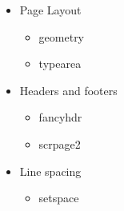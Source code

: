 \documentclass{article}
\begin{document}
	\begin{itemize}
		\item Page Layout
			\begin{itemize}
	\item geometry
	\item typearea
			\end{itemize}
	\item Headers and footers
			\begin{itemize}
	\item fancyhdr
	\item scrpage2
			\end{itemize}
	\item Line spacing
			\begin{itemize}
	\item setspace
			\end{itemize}
	\end{itemize}
\end{document}
